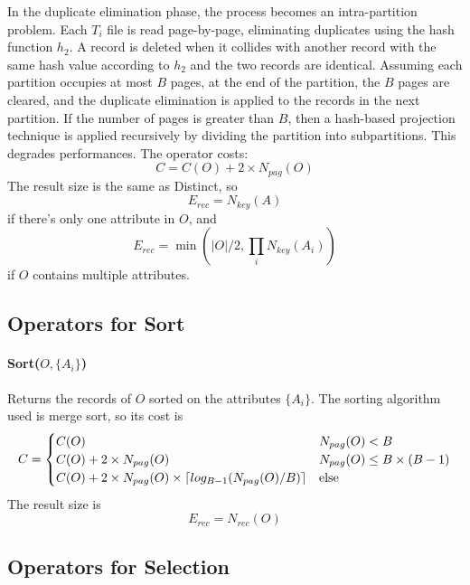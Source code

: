 In the duplicate elimination phase, the process becomes an intra-partition problem. Each $T_i$ file is read page-by-page, eliminating duplicates using the hash function $h_2$. A record is deleted when it collides with another record with the same hash value according to $h_2$ and the two records are identical. Assuming each partition occupies at most $B$ pages, at the end of the partition, the $B$ pages are cleared, and the duplicate elimination is applied to the records in the next partition. If the number of pages is greater than $B$, then a hash-based projection technique is applied recursively by dividing the partition into subpartitions. This degrades performances. The operator costs:
\begin{equation*}
    C = C(O) + 2 \times N_{pag}(O)
\end{equation*}
The result size is the same as Distinct, so
\begin{equation*}
    E_{rec} = N_{key}(A)
\end{equation*}
if there's only one attribute in $O$, and
\begin{equation*}
    E_{rec} = \min(|O|/2, \prod_i N_{key}(A_i))
\end{equation*}
if $O$ contains multiple attributes.

\subsection{Operators for Sort}

\paragraph{Sort($O, \{A_i\}$)}
Returns the records of $O$ sorted on the attributes $\{A_i\}$. The sorting algorithm used is merge sort, so its cost is
\begin{equation*}
    C = \begin{cases}
        C(O) & N_{pag}(O) < B \\
        C(O) + 2 \times N_{pag}(O) & N_{pag}(O) \leq B \times (B-1) \\
        C(O) + 2 \times N_{pag}(O) \times \left\lceil log_{B-1}(N_{pag}(O) / B)\right\rceil & \text{else}
    \end{cases}
\end{equation*}
The result size is
\begin{equation*}
    E_{rec} = N_{rec}(O)
\end{equation*}

\subsection{Operators for Selection}

